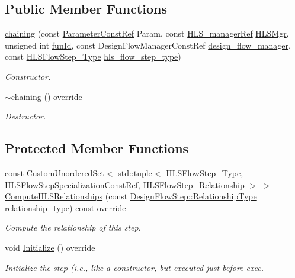 \subsection*{Public Member Functions}
\begin{DoxyCompactItemize}
\item 
\hyperlink{classchaining_a051b34ca72155fde015f0a303564dcba}{chaining} (const \hyperlink{Parameter_8hpp_a37841774a6fcb479b597fdf8955eb4ea}{Parameter\+Const\+Ref} Param, const \hyperlink{hls__manager_8hpp_acd3842b8589fe52c08fc0b2fcc813bfe}{H\+L\+S\+\_\+manager\+Ref} \hyperlink{classHLS__step_ade85003a99d34134418451ddc46a18e9}{H\+L\+S\+Mgr}, unsigned int \hyperlink{classHLSFunctionStep_a3e6434fd86c698b0c70520b859bff5b0}{fun\+Id}, const Design\+Flow\+Manager\+Const\+Ref \hyperlink{classDesignFlowStep_ab770677ddf087613add30024e16a5554}{design\+\_\+flow\+\_\+manager}, const \hyperlink{hls__step_8hpp_ada16bc22905016180e26fc7e39537f8d}{H\+L\+S\+Flow\+Step\+\_\+\+Type} \hyperlink{classHLS__step_aefd59af15346ec3f10bf12bd756e6777}{hls\+\_\+flow\+\_\+step\+\_\+type})
\begin{DoxyCompactList}\small\item\em Constructor. \end{DoxyCompactList}\item 
\hyperlink{classchaining_a131b44b5f5d80bd73e7536531e5af86d}{$\sim$chaining} () override
\begin{DoxyCompactList}\small\item\em Destructor. \end{DoxyCompactList}\end{DoxyCompactItemize}
\subsection*{Protected Member Functions}
\begin{DoxyCompactItemize}
\item 
const \hyperlink{classCustomUnorderedSet}{Custom\+Unordered\+Set}$<$ std\+::tuple$<$ \hyperlink{hls__step_8hpp_ada16bc22905016180e26fc7e39537f8d}{H\+L\+S\+Flow\+Step\+\_\+\+Type}, \hyperlink{hls__step_8hpp_a5fdd2edf290c196531d21d68e13f0e74}{H\+L\+S\+Flow\+Step\+Specialization\+Const\+Ref}, \hyperlink{hls__step_8hpp_a3ad360b9b11e6bf0683d5562a0ceb169}{H\+L\+S\+Flow\+Step\+\_\+\+Relationship} $>$ $>$ \hyperlink{classchaining_a4cb9e1dd2c6227b9570f4af04cdb4bac}{Compute\+H\+L\+S\+Relationships} (const \hyperlink{classDesignFlowStep_a723a3baf19ff2ceb77bc13e099d0b1b7}{Design\+Flow\+Step\+::\+Relationship\+Type} relationship\+\_\+type) const override
\begin{DoxyCompactList}\small\item\em Compute the relationship of this step. \end{DoxyCompactList}\item 
void \hyperlink{classchaining_a2ec8eacb120c33974ba7829842910880}{Initialize} () override
\begin{DoxyCompactList}\small\item\em Initialize the step (i.\+e., like a constructor, but executed just before exec. \end{DoxyCompactList}\end{DoxyCompactItemize}
